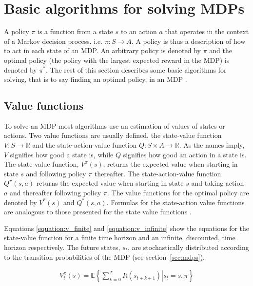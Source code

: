 \section{Basic algorithms for solving MDPs}

A policy $\pi$ is a function from a state $s$ to an action $a$ that operates in
the context of a Markov decision process, i.e. $\pi \colon S \to A$. A policy
is thus a description of how to act in each state of an MDP. An arbitrary
policy is denoted by $\pi$ and the optimal policy (the policy with the largest
expected reward in the MDP) is denoted by $\pi^*$. The rest of this section
describes some basic algorithms for solving, that is to say finding an optimal
policy, in an MDP \parencite{barto1998reinforcement}.

\subsection{Value functions}

To solve an MDP most algorithms use an estimation of values of states or
actions. Two value functions are usually defined, the state-value function $V :
S \to \mathbb R$ and the state-action-value function $Q : S \times A \to
\mathbb R$. As the names imply, $V$ signifies how good a state is, while $Q$
signifies how good an action in a state is. The state-value function,
$V^\pi(s)$, returns the expected value when starting in state $s$ and following
policy $\pi$ thereafter. The state-action-value function $Q^\pi(s, a)$ returns
the expected value when starting in state $s$ and taking action $a$ and
thereafter following policy $\pi$. The value functions for the optimal policy
are denoted by $V^*(s)$ and $Q^*(s, a)$. Formulas for the state-action value
functions are analogous to those presented for the state value functions
\parencite{barto1998reinforcement}. 

Equations \eqref{equation:v_finite} and \eqref{equation:v_infinite} show the
equations for the state-value function for a finite time horizon and an
infinite, discounted, time horizon respectively. The future states, $s_t$, 
are stochastically distributed according to the transition probabilities
of the MDP (see section~\ref{sec:mdps}).

\begin{align}
\label{equation:v_finite}
V_t^\pi(s) = \mathbb{E} \left\{
  \left. \sum^{T}_{k=0} R(s_{t+k+1})
  \right\vert s_t = s, \pi
\right\}
\end{align}

